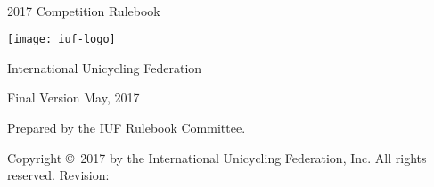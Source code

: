 \begin{titlepage}
\centering
\ \\
\vspace{5cm}
{\Huge 2017 Competition Rulebook}
\vspace{5mm}

\texttt{[image: iuf-logo]}

\vspace{5mm}
{\huge International Unicycling Federation}

\vspace{5mm}
{\Large Final Version \quad May, 2017}

\vspace{45mm}
Prepared by the IUF Rulebook Committee.

\vspace{5mm}
{\small Copyright \copyright\ 2017 by the International Unicycling Federation, Inc. All rights reserved.}
\small{Revision: \href{https://github.com/iuf/rulebook/commit/\gitHash}{\gitAbbrevHash} \ \gitCommitterDate}

\end{titlepage}
